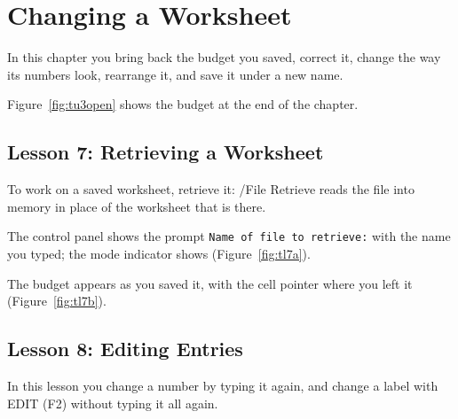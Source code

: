 \chapter{Changing a Worksheet}

In this chapter you bring back the budget you saved, correct it, change the
way its numbers look, rearrange it, and save it under a new name.

Figure~\ref{fig:tu3open} shows the budget at the end of the chapter.

\section{Lesson 7: Retrieving a Worksheet}
To work on a saved worksheet, retrieve it: /File Retrieve reads the file
into memory in place of the worksheet that is there.

\begin{Keystrokes}
\end{Keystrokes}
The control panel shows the prompt \texttt{Name of file to retrieve:} with
the name you typed; the mode indicator shows 
(Figure~\ref{fig:tl7a}).
\begin{Keystrokes}
\end{Keystrokes}
The budget appears as you saved it, with the cell pointer where you left it
(Figure~\ref{fig:tl7b}).

\section{Lesson 8: Editing Entries}
In this lesson you change a number by typing it again, and change a label
with EDIT (F2) without typing it all again.


